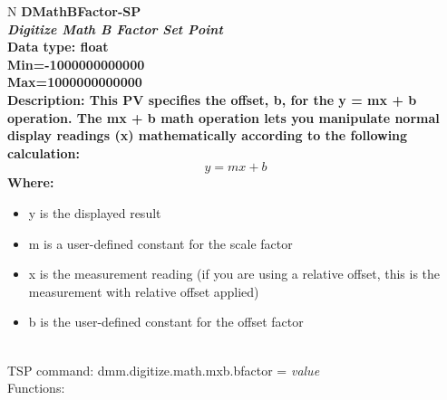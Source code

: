 \documentclass[openany]{article}
\begin{document}
		\begin{tabular}{N}
			\hline
			\bfseries DMathBFactor-SP\label{pv:dmathbfactor-sp} \\ \hline
			\emph{Digitize Math B Factor Set Point} \\
			Data type: float \\
			Min=-1000000000000 \\
			Max=1000000000000 \\
			Description: This PV specifies the offset, b, for the y = mx + b operation. The mx + b math operation lets you manipulate normal display readings (x) mathematically according to the following calculation: $$ y = mx + b $$ Where: \begin{itemize} \item y is the displayed result \item m is a user-defined constant for the scale factor \item x is the measurement reading (if you are using a relative offset, this is the measurement with relative offset applied) \item b is the user-defined constant for the offset factor \end{itemize} \\
			TSP command: dmm.digitize.math.mxb.bfactor = \emph{value} \\
			Functions: \\
			\arrayrulecolor{\FuncTableBorderColor}

		\end{tabular}
\end{document}
